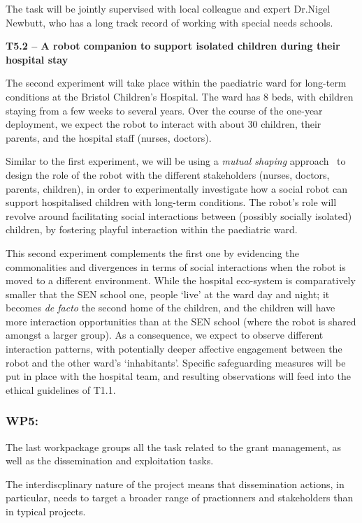The task will be jointly supervised with local colleague and expert Dr.Nigel Newbutt,
who has a long track record of working with special needs schools.

\textbf{T5.2 -- A robot companion to support isolated children during their
hospital stay}

The second experiment will take place within the paediatric ward for long-term
conditions at the Bristol Children's Hospital. The ward has 8 beds, with
children staying from a few weeks to several years. Over the course of the
one-year deployment, we expect the robot to interact with about 30 children,
their parents, and the hospital staff (nurses, doctors).

Similar to the first experiment, we will be using a \emph{mutual shaping}
approach~\cite{winkle2018social} to design the role of the robot with the
different stakeholders (nurses, doctors, parents, children), in order to
experimentally investigate how a social robot can support hospitalised children
with long-term conditions. The robot's role will revolve around facilitating
social interactions between (possibly socially isolated) children, by fostering
playful interaction within the paediatric ward.

This second experiment complements the first one by evidencing the commonalities
and divergences in terms of social interactions when the robot is moved to a
different environment. While the hospital eco-system is comparatively smaller that the SEN school one,
people `live' at the ward day and night; it becomes \emph{de facto} the second home of the
children, and the children will have more interaction opportunities than at the
SEN school (where the robot is shared amongst a larger group). As a consequence,
we expect to observe different interaction patterns, with potentially deeper
affective engagement between the robot and the other ward's `inhabitants'.
Specific safeguarding measures will be put in place with the hospital team, and
resulting observations will feed into the ethical guidelines of T1.1.


\subsubsection{WP5: \textbf{\wpSeven}}

The last workpackage groups all the task related to the grant management, as
well as the dissemination and exploitation tasks.

The interdiscplinary nature of the project means that dissemination actions, in
particular, needs to target a broader range of practionners and stakeholders
than in typical projects.

